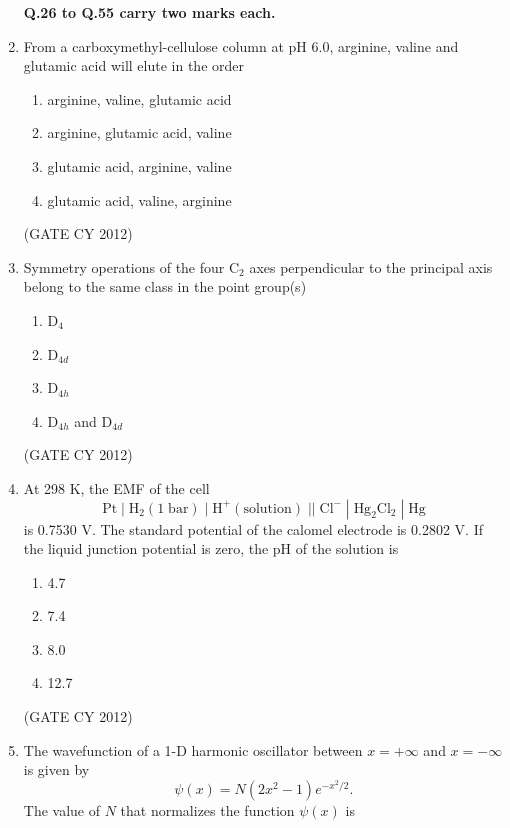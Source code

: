 \documentclass[12pt]{article}
\begin{document}
\begin{enumerate}
\textbf{Q.26 to Q.55 carry two marks each.}

\item From a carboxymethyl-cellulose column at pH 6.0, arginine, valine and glutamic acid will elute in the order
\begin{multicols}{2}
\begin{enumerate}
    \item arginine, valine, glutamic acid
    \item arginine, glutamic acid, valine
    \item glutamic acid, arginine, valine
    \item glutamic acid, valine, arginine
\end{enumerate}
\end{multicols}
\hfill (GATE CY 2012)

\item Symmetry operations of the four C$_2$ axes perpendicular to the principal axis belong to the same class in the point group(s)
\begin{multicols}{2}
\begin{enumerate}
    \item D$_4$
    \item D$_{4d}$
    \item D$_{4h}$
    \item D$_{4h}$ and D$_{4d}$
\end{enumerate}
\end{multicols}
\hfill (GATE CY 2012)

\item At 298 K, the EMF of the cell
\[
\text{Pt} \;|\; \text{H}_2(1\;\text{bar}) \;|\; \text{H}^+(\text{solution}) \;||\; \text{Cl}^- \;|\; \text{Hg}_2\text{Cl}_2 \;|\; \text{Hg}
\]
is 0.7530 V. The standard potential of the calomel electrode is 0.2802 V. If the liquid junction potential is zero, the pH of the solution is
\begin{multicols}{2}
\begin{enumerate}
    \item 4.7
    \item 7.4
    \item 8.0
    \item 12.7
\end{enumerate}
\end{multicols}
\hfill (GATE CY 2012)

\item The wavefunction of a 1-D harmonic oscillator between $x = +\infty$ and $x = -\infty$ is given by 
\[
\psi(x) = N(2x^2 - 1)e^{-x^2/2}.
\] 
The value of $N$ that normalizes the function $\psi(x)$ is 


\end{enumerate}
\end{document}
